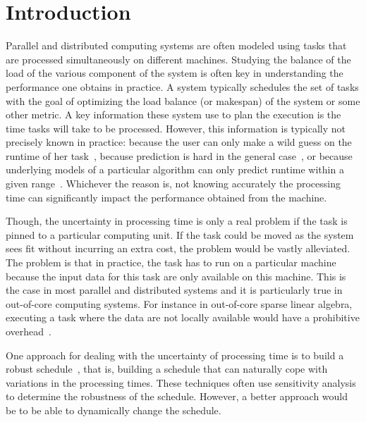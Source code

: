 \documentclass[10pt, conference, compsocconf]{IEEEtran}
\begin{document}
\IEEEpeerreviewmaketitle

\section{Introduction}

Parallel and distributed computing systems are often modeled using
tasks that are processed simultaneously on different
machines. Studying the balance of the load of the various component of
the system is often key in understanding the performance one obtains
in practice. A system typically schedules the set of tasks with the
goal of optimizing the load balance (or makespan) of the system or
some other metric. A key information these system use to plan the
execution is the time tasks will take to be processed. However, this
information is typically not precisely known in practice: because the
user can only make a wild guess on the runtime of her
task~\cite{Luong2008}, because prediction is hard in the general
case~\cite{Wilhelm2008}, or because underlying models of a particular
algorithm can only predict runtime within a given
range~\cite{Erlebacher14-ICS}. Whichever the reason is, not knowing
accurately the processing time can significantly impact the
performance obtained from the machine.

Though, the uncertainty in processing time is only a real problem if
the task is pinned to a particular computing unit. If the task could
be moved as the system sees fit without incurring an extra cost, the
problem would be vastly alleviated. The problem is that in practice,
the task has to run on a particular machine because the input data for
this task are only available on this machine. This is the case in most
parallel and distributed systems and it is particularly true in
out-of-core computing systems. For instance in out-of-core sparse
linear algebra, executing a task where the data are not locally
available would have a prohibitive
overhead~\cite{Zhou12-Cluster,Zhou12-P2S2}.

One approach for dealing with the uncertainty of processing time is to
build a robust schedule~\cite{cj09c,Gatto07,
  Davenport_slack-basedtechniques}, that is, building a schedule that
can naturally cope with variations in the processing times. These
techniques often use sensitivity analysis to determine the robustness
of the schedule. However, a better approach would be to be able to
dynamically change the schedule. 
\end{document}
